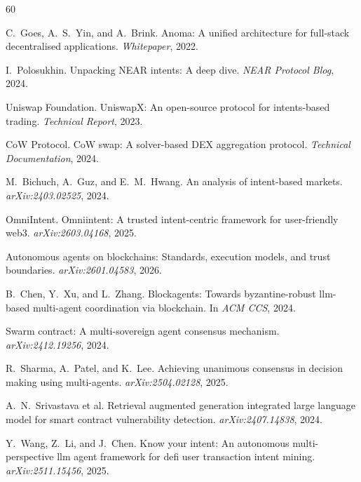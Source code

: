 \documentclass[11pt]{article}
\begin{document}
\begin{thebibliography}{60}

C.~Goes, A.~S.~Yin, and A.~Brink.
\newblock Anoma: A unified architecture for full-stack decentralised applications.
\newblock \textit{Whitepaper}, 2022.

I.~Polosukhin.
\newblock Unpacking NEAR intents: A deep dive.
\newblock \textit{NEAR Protocol Blog}, 2024.

Uniswap Foundation.
\newblock UniswapX: An open-source protocol for intents-based trading.
\newblock \textit{Technical Report}, 2023.

CoW Protocol.
\newblock CoW swap: A solver-based DEX aggregation protocol.
\newblock \textit{Technical Documentation}, 2024.

M.~Bichuch, A.~Guz, and E.~M.~Hwang.
\newblock An analysis of intent-based markets.
\newblock \textit{arXiv:2403.02525}, 2024.

OmniIntent.
\newblock Omniintent: A trusted intent-centric framework for user-friendly web3.
\newblock \textit{arXiv:2603.04168}, 2025.

Autonomous agents on blockchains: Standards, execution models, and trust boundaries.
\newblock \textit{arXiv:2601.04583}, 2026.

B.~Chen, Y.~Xu, and L.~Zhang.
\newblock Blockagents: Towards byzantine-robust llm-based multi-agent coordination via blockchain.
\newblock In \textit{ACM CCS}, 2024.

Swarm contract: A multi-sovereign agent consensus mechanism.
\newblock \textit{arXiv:2412.19256}, 2024.

R.~Sharma, A.~Patel, and K.~Lee.
\newblock Achieving unanimous consensus in decision making using multi-agents.
\newblock \textit{arXiv:2504.02128}, 2025.

A.~N.~Srivastava et al.
\newblock Retrieval augmented generation integrated large language model for smart contract vulnerability detection.
\newblock \textit{arXiv:2407.14838}, 2024.

Y.~Wang, Z.~Li, and J.~Chen.
\newblock Know your intent: An autonomous multi-perspective llm agent framework for defi user transaction intent mining.
\newblock \textit{arXiv:2511.15456}, 2025.


\end{thebibliography}
\end{document}
